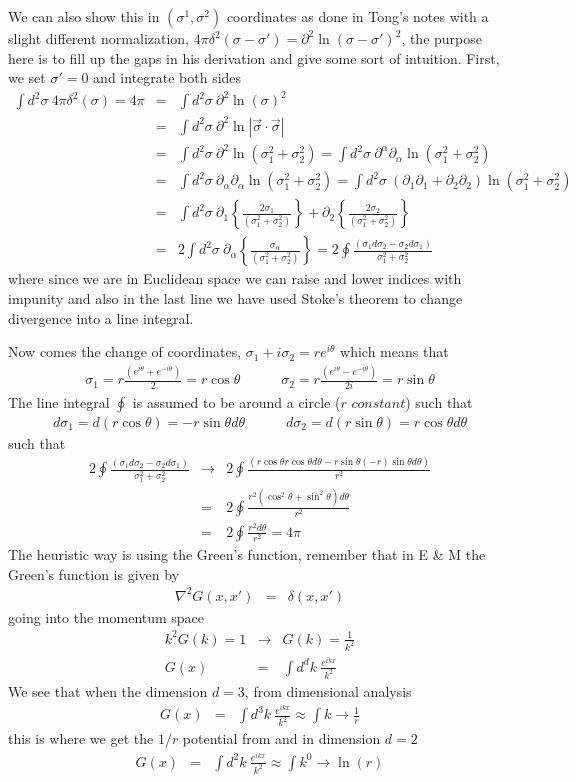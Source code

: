 \documentclass[aps,preprint,preprintnumbers,nofootinbib,showpacs,prd]{revtex4-1}
\newcommand{\nbea}{\begin{eqnarray*}}
\newcommand{\neea}{\end{eqnarray*}}
\begin{document}
We can also show this in $(\sigma^1,\sigma^2)$ coordinates as done in Tong's notes with a slight different normalization, $4\pi \delta^2(\sigma - \sigma') = \partial^2 \ln(\sigma - \sigma')^2$, the purpose here is to fill up the gaps in his derivation and give some sort of intuition. First, we set $\sigma' = 0$ and integrate both sides
%
\nbea
\int d^2\sigma~ 4\pi \delta^2(\sigma) = 4\pi & = & \int d^2\sigma~\partial^2 \ln(\sigma)^2 \\
& = & \int d^2\sigma~\partial^2 \ln |\vec \sigma \cdot \vec \sigma| \\
& = & \int d^2\sigma~\partial^2 \ln (\sigma_1^2 + \sigma_2^2) = \int d^2\sigma~\partial^\alpha\partial_\alpha \ln (\sigma_1^2 + \sigma_2^2) \\
& = & \int d^2\sigma~\partial_\alpha\partial_\alpha \ln (\sigma_1^2 + \sigma_2^2) = \int d^2\sigma~(\partial_1\partial_1 + \partial_2\partial_2) \ln (\sigma_1^2 + \sigma_2^2) \\
& = & \int d^2\sigma~\partial_1 \left \{ \frac{2 \sigma_1}{ (\sigma_1^2 + \sigma_2^2) } \right \} + \partial_2 \left \{ \frac{2 \sigma_2}{ (\sigma_1^2 + \sigma_2^2) } \right \} \\
& = & 2 \int d^2\sigma~\partial_\alpha \left \{ \frac{\sigma_\alpha}{ (\sigma_1^2 + \sigma_2^2) } \right \} = 2 \oint \frac{(\sigma_1 d\sigma_2 - \sigma_2 d\sigma_1)}{ \sigma_1^2 + \sigma_2^2 } 
\neea
%
where since we are in Euclidean space we can raise and lower indices with impunity and also in the last line we have used Stoke's theorem to change divergence into a line integral.

Now comes the change of coordinates, $\sigma_1 + i\sigma_2 = r e^{i\theta}$ which means that
%
\nbea
\sigma_1 = r \frac{(e^{i\theta} + e^{-i\theta})}{2} = r \cos\theta & ~~~~~~ & \sigma_2 = r \frac{(e^{i\theta} - e^{-i\theta})}{2i} = r \sin\theta
\neea
%
The line integral $\oint$ is assumed to be around a circle ($r$ $constant$) such that
%
\nbea
d\sigma_1 = d(r \cos\theta) = -r \sin\theta d\theta & ~~~~~~ & d\sigma_2 = d(r \sin\theta) = r \cos\theta d\theta
\neea
%
such that
%
\nbea
2 \oint \frac{(\sigma_1 d\sigma_2 - \sigma_2 d\sigma_1)}{ \sigma_1^2 + \sigma_2^2 } & \rightarrow & 2 \oint \frac{(r \cos\theta r \cos\theta d\theta - r \sin\theta(-r) \sin\theta d\theta )}{ r^2 } \\
& = & 2 \oint \frac{r^2 (\cos^2\theta + \sin^2\theta) d\theta}{ r^2 } \\
& = & 2 \oint \frac{r^2 d\theta}{ r^2 } = 4\pi
\neea
%
The heuristic way is using the Green's function, remember that in E \& M the Green's function is given by
%
\nbea
\nabla^2 G(x,x') & = & \delta(x,x')
\neea
%
going into the momentum space
%
\nbea
k^2 G(k) = 1 & \rightarrow & G(k) = \frac{1}{k^2} \\
G(x) & = & \int d^d k~ \frac{e^{ikx}}{k^2}
\neea
%
We see that when the dimension $d=3$, from dimensional analysis
%
\nbea
G(x) & = & \int d^3 k~ \frac{e^{ikx}}{k^2} \approx \int k \rightarrow \frac{1}{r}
\neea
%
this is where we get the $1/r$ potential from and in dimension $d=2$
%
\nbea
G(x) & = & \int d^2 k~ \frac{e^{ikx}}{k^2} \approx \int k^0 \rightarrow \ln(r)
\neea
%
\end{document}
